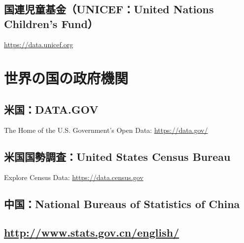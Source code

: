 \documentclass[
  xelatex, ja=standard]{bxjsbook}
\theoremstyle{definition}
\theoremstyle{definition}
\theoremstyle{definition}
\theoremstyle{definition}
\theoremstyle{remark}
\begin{document}
\hypertarget{ux56fdux9023ux5150ux7ae5ux57faux91d1unicefunited-nations-childrens-fund}{%
\subsection{\texorpdfstring{\textbf{国連児童基金}（UNICEF：United Nations Children's Fund）}{国連児童基金（UNICEF：United Nations Children's Fund）}}\label{ux56fdux9023ux5150ux7ae5ux57faux91d1unicefunited-nations-childrens-fund}}

\url{https://data.unicef.org}

\hypertarget{ux4e16ux754cux306eux56fdux306eux653fux5e9cux6a5fux95a2}{%
\section{世界の国の政府機関}\label{ux4e16ux754cux306eux56fdux306eux653fux5e9cux6a5fux95a2}}

\hypertarget{ux7c73ux56fddata.gov}{%
\subsection{米国：DATA.GOV}\label{ux7c73ux56fddata.gov}}

The Home of the U.S. Government's Open Data: \url{https://data.gov/}

\hypertarget{ux7c73ux56fdux56fdux52e2ux8abfux67fbunited-states-census-bureau}{%
\subsection{米国国勢調査：United States Census Bureau}\label{ux7c73ux56fdux56fdux52e2ux8abfux67fbunited-states-census-bureau}}

Explore Census Data: \url{https://data.census.gov}

\hypertarget{ux4e2dux56fdnational-bureaus-of-statistics-of-china}{%
\subsection{中国：National Bureaus of Statistics of China}\label{ux4e2dux56fdnational-bureaus-of-statistics-of-china}}

\hypertarget{httpwww.stats.gov.cnenglish}{%
\subsection{\texorpdfstring{\url{http://www.stats.gov.cn/english/}}{http://www.stats.gov.cn/english/}}\label{httpwww.stats.gov.cnenglish}}
\end{document}
